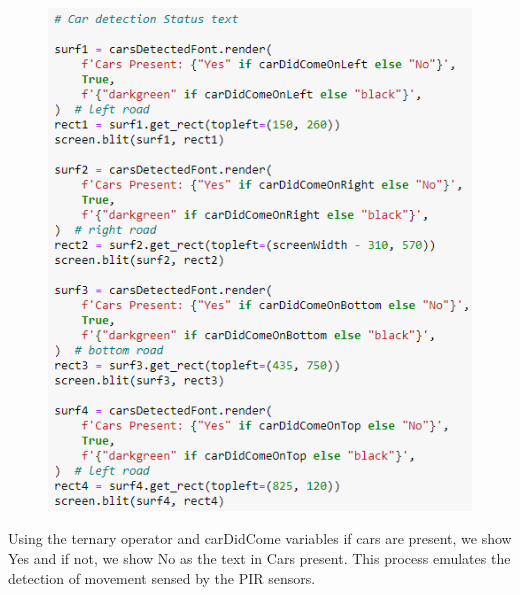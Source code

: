 \documentclass[12pt, a4paper,titlepage]{article}
\begin{document}
\begin{figure}[H]
	\centering
	\includegraphics[width=\linewidth]{images/p4}
	\caption{}
	\label{fig:p4}
\end{figure}

Using the ternary operator and carDidCome variables if cars are present, we show Yes and if not, we show No as the text in Cars present. This process emulates the detection of movement sensed by the PIR sensors.
\end{document}
